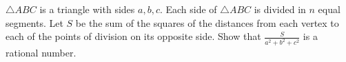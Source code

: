$\triangle ABC$ is a triangle with sides $a,b,c$. Each side of $\triangle ABC$ is divided in $n$ equal segments. Let $S$ be the sum of the squares of the distances from each vertex to each of the points of division on its opposite side. Show that $\frac{S}{a^2+b^2+c^2}$ is a rational number.